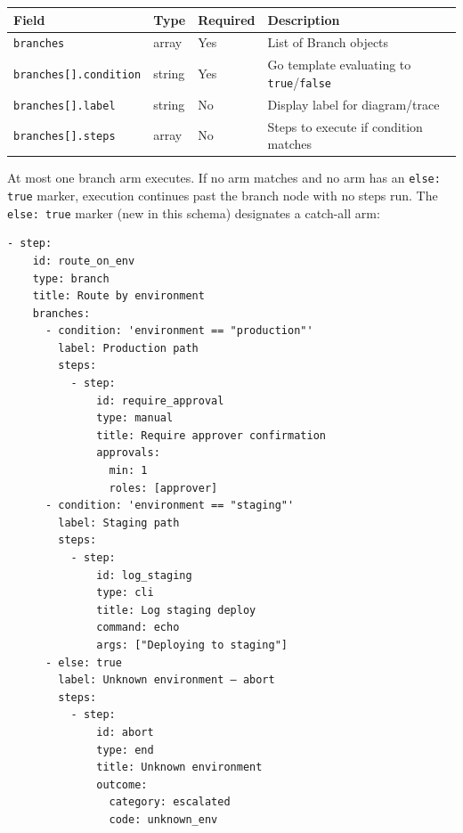\begin{center}
\begin{tabular}{lllp{5cm}}
\hline
\textbf{Field} & \textbf{Type} & \textbf{Required} & \textbf{Description} \\
\hline
\texttt{branches}           & array  & Yes & List of Branch objects \\
\texttt{branches[].condition} & string & Yes & Go template evaluating to \texttt{true}/\texttt{false} \\
\texttt{branches[].label}   & string & No  & Display label for diagram/trace \\
\texttt{branches[].steps}   & array  & No  & Steps to execute if condition matches \\
\hline
\end{tabular}
\end{center}

At most one branch arm executes.  If no arm matches and no arm has an
\texttt{else: true} marker, execution continues past the branch node with no
steps run.  The \texttt{else: true} marker (new in this schema) designates a catch-all
arm:

\begin{verbatim}
- step:
    id: route_on_env
    type: branch
    title: Route by environment
    branches:
      - condition: 'environment == "production"'
        label: Production path
        steps:
          - step:
              id: require_approval
              type: manual
              title: Require approver confirmation
              approvals:
                min: 1
                roles: [approver]
      - condition: 'environment == "staging"'
        label: Staging path
        steps:
          - step:
              id: log_staging
              type: cli
              title: Log staging deploy
              command: echo
              args: ["Deploying to staging"]
      - else: true
        label: Unknown environment — abort
        steps:
          - step:
              id: abort
              type: end
              title: Unknown environment
              outcome:
                category: escalated
                code: unknown_env
\end{verbatim}


